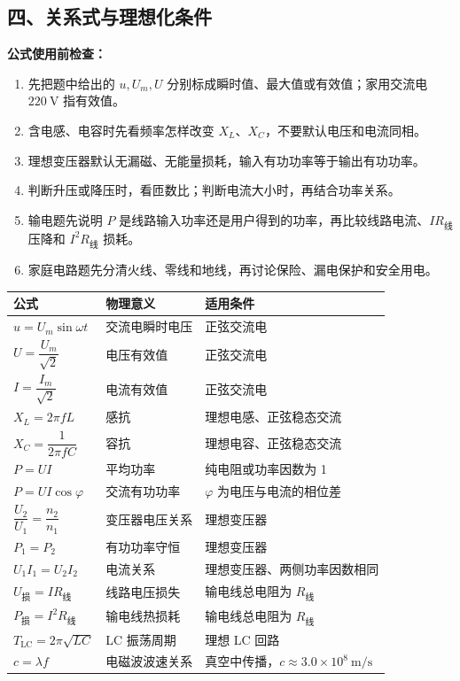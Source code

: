 \begin{samepage}
\section*{四、关系式与理想化条件}

\textbf{公式使用前检查：}
\nopagebreak[4]
\begin{enumerate}
  \item 先把题中给出的 $u,U_m,U$ 分别标成瞬时值、最大值或有效值；家用交流电 $220\ \mathrm{V}$ 指有效值。
  \item 含电感、电容时先看频率怎样改变 $X_L$、$X_C$，不要默认电压和电流同相。
  \item 理想变压器默认无漏磁、无能量损耗，输入有功功率等于输出有功功率。
  \item 判断升压或降压时，看匝数比；判断电流大小时，再结合功率关系。
  \item 输电题先说明 $P$ 是线路输入功率还是用户得到的功率，再比较线路电流、$IR_{\text{线}}$ 压降和 $I^2R_{\text{线}}$ 损耗。
  \item 家庭电路题先分清火线、零线和地线，再讨论保险、漏电保护和安全用电。
\end{enumerate}
\end{samepage}

\begin{center}
\begin{tabular}{lll}
\toprule
公式 & 物理意义 & 适用条件 \\
\midrule
$u=U_m\sin\omega t$ & 交流电瞬时电压 & 正弦交流电 \\
$U=\dfrac{U_m}{\sqrt2}$ & 电压有效值 & 正弦交流电 \\
$I=\dfrac{I_m}{\sqrt2}$ & 电流有效值 & 正弦交流电 \\
$X_L=2\pi fL$ & 感抗 & 理想电感、正弦稳态交流 \\
$X_C=\dfrac{1}{2\pi fC}$ & 容抗 & 理想电容、正弦稳态交流 \\
$P=UI$ & 平均功率 & 纯电阻或功率因数为 1 \\
$P=UI\cos\varphi$ & 交流有功功率 & $\varphi$ 为电压与电流的相位差 \\
$\dfrac{U_2}{U_1}=\dfrac{n_2}{n_1}$ & 变压器电压关系 & 理想变压器 \\
$P_1=P_2$ & 有功功率守恒 & 理想变压器 \\
$U_1I_1=U_2I_2$ & 电流关系 & 理想变压器、两侧功率因数相同 \\
$U_{\text{损}}=IR_{\text{线}}$ & 线路电压损失 & 输电线总电阻为 $R_{\text{线}}$ \\
$P_{\text{损}}=I^2R_{\text{线}}$ & 输电线热损耗 & 输电线总电阻为 $R_{\text{线}}$ \\
$T_{\mathrm{LC}}=2\pi\sqrt{LC}$ & LC 振荡周期 & 理想 LC 回路 \\
$c=\lambda f$ & 电磁波波速关系 & 真空中传播，$c\approx3.0\times10^8\ \mathrm{m/s}$ \\
\bottomrule
\end{tabular}
\end{center}

